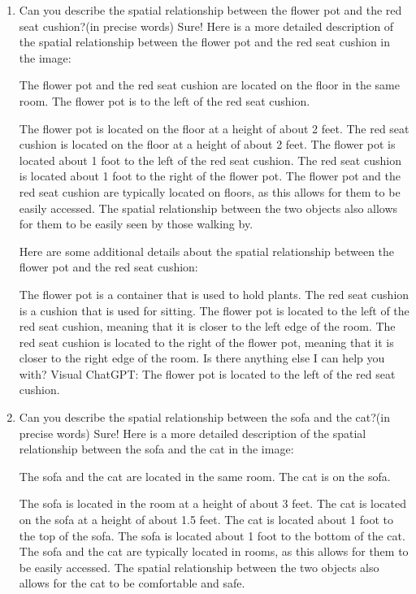 \begin{enumerate}
    \item Can you describe the spatial relationship between the flower pot and the red seat cushion?(in precise words)
    \subitem Sure! Here is a more detailed description of the spatial relationship between the flower pot and the red seat cushion in the image:

    The flower pot and the red seat cushion are located on the floor in the same room. The flower pot is to the left of the red seat cushion.
    
    The flower pot is located on the floor at a height of about 2 feet.
    The red seat cushion is located on the floor at a height of about 2 feet.
    The flower pot is located about 1 foot to the left of the red seat cushion.
    The red seat cushion is located about 1 foot to the right of the flower pot.
    The flower pot and the red seat cushion are typically located on floors, as this allows for them to be easily accessed. The spatial relationship between the two objects also allows for them to be easily seen by those walking by.
    
    Here are some additional details about the spatial relationship between the flower pot and the red seat cushion:
    
    The flower pot is a container that is used to hold plants.
    The red seat cushion is a cushion that is used for sitting.
    The flower pot is located to the left of the red seat cushion, meaning that it is closer to the left edge of the room.
    The red seat cushion is located to the right of the flower pot, meaning that it is closer to the right edge of the room.
    Is there anything else I can help you with?
    \subitem Visual ChatGPT: The flower pot is located to the left of the red seat cushion.
    \item Can you describe the spatial relationship between the sofa and the cat?(in precise words)
    \subitem Sure! Here is a more detailed description of the spatial relationship between the sofa and the cat in the image:

    The sofa and the cat are located in the same room. The cat is on the sofa.
    
    The sofa is located in the room at a height of about 3 feet.
    The cat is located on the sofa at a height of about 1.5 feet.
    The cat is located about 1 foot to the top of the sofa.
    The sofa is located about 1 foot to the bottom of the cat.
    The sofa and the cat are typically located in rooms, as this allows for them to be easily accessed. The spatial relationship between the two objects also allows for the cat to be comfortable and safe.
    

\end{enumerate}
